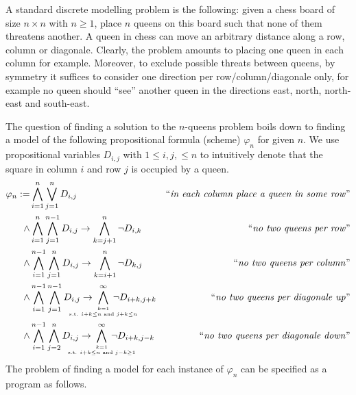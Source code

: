\documentclass[twoside]{article}
\begin{document}
A standard discrete modelling problem is the following: given a chess board of size $n \times n$ with $n \ge 1$, place $n$ queens on this board such that
none of them threatens another. A queen in chess can move an arbitrary distance along a row, column or diagonale. Clearly, the problem
amounts to placing one queen in each column for example. Moreover, to exclude possible threats between queens, by symmetry it suffices to
consider one direction per row/column/diagonale only, for example no queen should ``see'' another queen in the directions east, north, 
north-east and south-east. 

The question of finding a solution to the $n$-queens problem boils down to finding a model of the following propositional formula (scheme) $\varphi_n$ for
given $n$. We use propositional variables $D_{i,j}$ with $1 \le i,j, \le n$ to intuitively denote that the square in column $i$ and row $j$ is occupied by a queen.
\begin{align*}
\varphi_n := & \bigwedge\limits_{i=1}^n \bigvee\limits_{j=1}^n D_{i,j} & \text{``\emph{in each column place a queen in some row}''} \\
\wedge & \bigwedge\limits_{i=1}^n \bigwedge\limits_{j=1}^{n-1} D_{i,j} \to \bigwedge\limits_{k=j+1}^n \neg D_{i,k} & \text{``\emph{no two queens per row}''} \\ 
\wedge & \bigwedge\limits_{i=1}^{n-1} \bigwedge\limits_{j=1}^n D_{i,j} \to \bigwedge\limits_{k=i+1}^n \neg D_{k,j} & \text{``\emph{no two queens per column}''} \\ 
\wedge & \bigwedge\limits_{i=1}^{n-1} \bigwedge\limits_{j=1}^{n-1} D_{i,j} \to \hspace*{-1cm} 
  \bigwedge\limits_{k = 1 \atop \text{s.t. } i+k \le n \text{ and } j+k \le n}^\infty \hspace*{-1cm}\neg D_{i+k,j+k} 
  & \text{``\emph{no two queens per diagonale up}''} \\ 
\wedge & \bigwedge\limits_{i=1}^{n-1} \bigwedge\limits_{j=2}^{n} D_{i,j} \to \hspace*{-1cm} 
  \bigwedge\limits_{k = 1 \atop \text{s.t. } i+k \le n \text{ and } j-k \ge 1}^\infty \hspace*{-1cm}\neg D_{i+k,j-k} 
  & \text{``\emph{no two queens per diagonale down}''} \\ 
\end{align*}
The problem of finding a model for each instance of $\varphi_n$ can be specified as a \DiMo program as follows.
\end{document}
